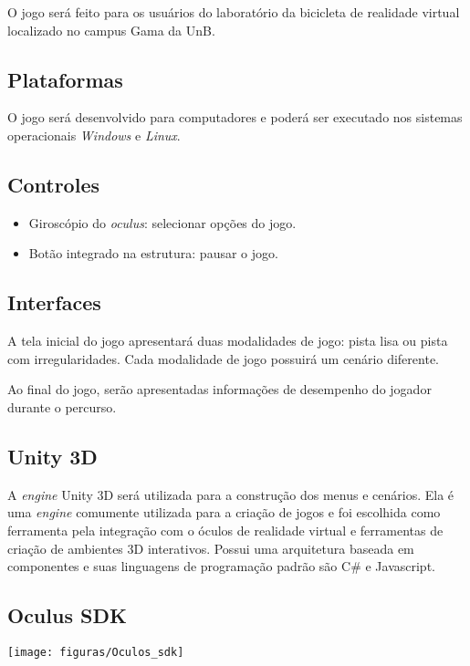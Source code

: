 O jogo será feito para os usuários do laboratório da bicicleta de realidade virtual localizado no campus Gama da UnB.

\subsection{Plataformas}

O jogo será desenvolvido para computadores e poderá ser executado nos sistemas operacionais \textit{Windows} e \textit{Linux}.

\subsection{Controles}

\begin{itemize}
\item Giroscópio do \textit{oculus}: selecionar opções do jogo.
\item Botão integrado na estrutura: pausar o jogo.
\end{itemize}

\subsection{Interfaces}

A tela inicial do jogo apresentará duas modalidades de jogo: pista lisa ou pista com irregularidades. Cada modalidade de jogo possuirá um cenário diferente.

Ao final do jogo, serão apresentadas informações de desempenho do jogador durante o percurso.

\subsection{Unity 3D}

A \textit{engine} Unity 3D será utilizada para a construção dos menus e cenários. Ela é uma \textit{engine} comumente utilizada para a criação de jogos e foi escolhida como ferramenta pela integração com o óculos de realidade virtual e ferramentas de criação de ambientes 3D interativos. Possui uma arquitetura baseada em componentes e suas linguagens de programação padrão são C\# e Javascript.

\subsection{Oculus SDK}

\begin{center}
	\texttt{[image: figuras/Oculos\_sdk]}
\end{center}

